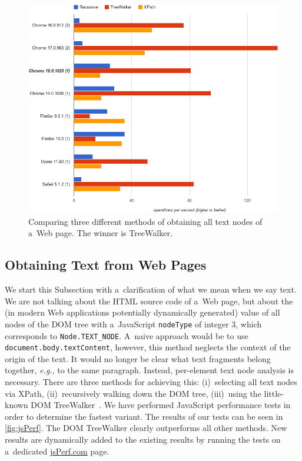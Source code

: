 \documentclass{sig-alternate}
\let\oldemph\emph
\renewcommand{\emph}[1]{\oldemph{\fontsize{9}{9}\selectfont #1}}
\begin{document}
\begin{figure}[t!]
\begin{center}
   \includegraphics[width=1\linewidth]{./jsPerf.png}
\end{center}
   \caption{Comparing three different methods of obtaining all text nodes of a~Web page. The winner is TreeWalker.}
\label{fig:jsPerf}
\end{figure}

\subsection{Obtaining Text from Web Pages}
We start this Subsection with a~clarification of what we mean when we say text.
We are not talking about the HTML source code of a~Web page,
but about the (in modern Web applications potentially dynamically generated) value of all nodes
of the DOM tree with a~JavaScript \texttt{nodeType} of integer $3$,
which corresponds to \texttt{Node.TEXT\_NODE}.
A~naive approach would be to use \texttt{document.body.textContent}, however,
this method neglects the context of the origin of the text.
It would no longer be clear what text fragments belong together, \emph{e.g.}, to the same paragraph.
Instead, per-element text node analysis is necessary.
There are three methods for achieving this:
(i)~selecting all text nodes via XPath,
\linebreak
(ii)~recursively walking down the DOM tree,
(iii)~using the little-known DOM TreeWalker~\cite{treewalker}.
We have performed Java\-Script performance tests in order to determine the fastest variant.
The results of our tests can be seen in \autoref{fig:jsPerf}.
The DOM TreeWalker clearly outperforms all other methods.
New results are dynamically added to the existing results by running the tests on a~dedicated \url{jsPerf.com} page\footnotemark[3].
\end{document}
